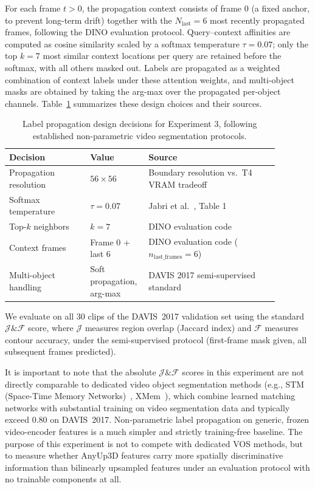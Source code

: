 For each frame $t > 0$, the propagation context consists of frame $0$ (a fixed anchor, to prevent long-term drift) together with the $N_{\text{last}} = 6$ most recently propagated frames, following the DINO evaluation protocol.
Query–context affinities are computed as cosine similarity scaled by a softmax temperature $\tau = 0.07$; only the top $k = 7$ most similar context locations per query are retained before the softmax, with all others masked out.
Labels are propagated as a weighted combination of context labels under these attention weights, and multi-object masks are obtained by taking the arg-max over the propagated per-object channels.
Table~\ref{tab:jf-setup} summarizes these design choices and their sources.

\begin{table}[t]
\centering
\caption{Label propagation design decisions for Experiment 3, following established non-parametric video segmentation protocols.}
\label{tab:jf-setup}
\small
\begin{tabular}{p{0.28\linewidth} p{0.15\linewidth} p{0.45\linewidth}}
\toprule
\textbf{Decision} & \textbf{Value} & \textbf{Source} \\
\midrule
Propagation resolution & $56 \times 56$ & Boundary resolution vs.\ T4 VRAM tradeoff \\
Softmax temperature & $\tau = 0.07$ & Jabri et al.~\cite{jabri2020}, Table 1 \\
Top-$k$ neighbors & $k = 7$ & DINO evaluation code~\cite{caron2021dino} \\
Context frames & Frame 0 + last 6 & DINO evaluation code ($n_{\text{last\_frames}}=6$) \\
Multi-object handling & Soft propagation, arg-max & DAVIS 2017 semi-supervised standard \\
\bottomrule
\end{tabular}
\end{table}

We evaluate on all 30 clips of the DAVIS~2017 validation set using the standard $\mathcal{J}\&\mathcal{F}$ score, where $\mathcal{J}$ measures region overlap (Jaccard index) and $\mathcal{F}$ measures contour accuracy, under the semi-supervised protocol (first-frame mask given, all subsequent frames predicted).

It is important to note that the absolute $\mathcal{J}\&\mathcal{F}$ scores in this experiment are not directly comparable to dedicated video object segmentation methods (e.g., STM (Space-Time Memory Networks)~\cite{stm}, XMem~\cite{xmem}), which combine learned matching networks with substantial training on video segmentation data and typically exceed $0.80$ on DAVIS~2017.
Non-parametric label propagation on generic, frozen video-encoder features is a much simpler and strictly training-free baseline.
The purpose of this experiment is not to compete with dedicated VOS methods, but to measure whether AnyUp3D features carry more spatially discriminative information than bilinearly upsampled features under an evaluation protocol with no trainable components at all.

